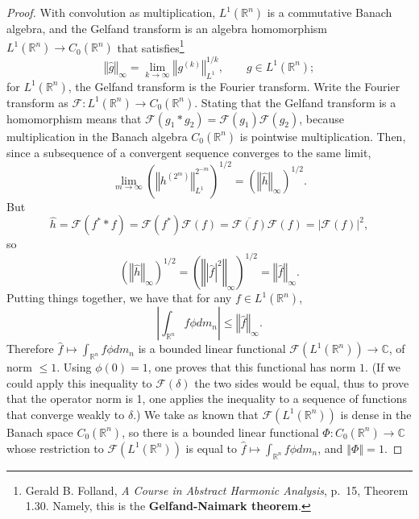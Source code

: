 \documentclass{article}
\newcommand{\norm}[1]{\left\Vert #1 \right\Vert}
\theoremstyle{definition}
\theoremstyle{definition}
\begin{document}
\begin{proof}
With convolution as multiplication, $L^1(\mathbb{R}^n)$ is a commutative Banach algebra, and the Gelfand
transform is an algebra homomorphism $L^1(\mathbb{R}^n) \to C_0(\mathbb{R}^n)$ that satisfies\footnote{Gerald B. Folland,
{\em A Course in Abstract Harmonic Analysis}, p.~15, Theorem 1.30. Namely, this is the \textbf{Gelfand-Naimark theorem}.}
\[
\norm{\hat{g}}_\infty = \lim_{k \to \infty} \norm{g^{(k)}}_{L^1}^{1/k}, \qquad g \in L^1(\mathbb{R}^n);
\]
for $L^1(\mathbb{R}^n)$, the Gelfand transform is the Fourier transform. Write the Fourier transform as 
$\mathscr{F}:L^1(\mathbb{R}^n) \to C_0(\mathbb{R}^n)$. Stating that the Gelfand transform is a homomorphism
means that $\mathscr{F}(g_1*g_2)=\mathscr{F}(g_1) \mathscr{F}(g_2)$, because multiplication in the Banach algebra $C_0(\mathbb{R}^n)$
is pointwise multiplication.
Then, since a subsequence of a convergent sequence converges to the same limit,
\[
\lim_{m \to \infty} \left(\norm{h^{\left(2^m\right)}}_{L^1}^{2^{-m}}\right)^{1/2} = \left( \norm{\hat{h}}_\infty \right)^{1/2}.
\]
But
\[
\hat{h}=\mathscr{F}(f^* * f) = \mathscr{F}(f^*) \mathscr{F}(f) = \overline{\mathscr{F}(f)} \mathscr{F}(f)= \left| \mathscr{F}(f) \right|^2,
\]
so
\[
\left( \norm{\hat{h}}_\infty \right)^{1/2} = \left( \norm{|\hat{f}|^2}_\infty \right)^{1/2} = \norm{\hat{f}}_\infty.
\]
Putting things together, we have that for any $f \in L^1(\mathbb{R}^n)$,
\[
\left| \int_{\mathbb{R}^n} f \phi dm_n \right| \leq \norm{\hat{f}}_\infty.
\]
Therefore $\hat{f} \mapsto \int_{\mathbb{R}^n} f \phi dm_n$ is a bounded linear functional $\mathscr{F}(L^1(\mathbb{R}^n)) \to \mathbb{C}$, of norm
$\leq 1$. Using $\phi(0)=1$, one proves that this functional has norm $1$. (If we could apply this inequality to $\mathscr{F}(\delta)$ the two sides would be equal, thus
 to prove that the operator norm is 1, one applies the inequality to a sequence of functions that converge weakly to $\delta$.)
We take as known that $\mathscr{F}(L^1(\mathbb{R}^n))$ is dense in the Banach space $C_0(\mathbb{R}^n)$, so there is a 
bounded linear functional $\Phi:C_0(\mathbb{R}^n) \to \mathbb{C}$ whose restriction to
$\mathscr{F}(L^1(\mathbb{R}^n))$ is equal to $\hat{f} \mapsto \int_{\mathbb{R}^n} f \phi dm_n$, and  $\norm{\Phi}=1$.


\end{proof}
\end{document}

